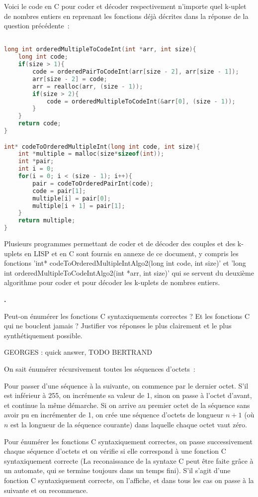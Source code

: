 \documentclass{article}
\newcounter{enoncecount}
\newenvironment{enonce}
{
\stepcounter{enoncecount}
\bf\small \arabic{enoncecount}.
\begin{bf}
}
{
\end{bf}
}
\begin{document}
Voici le code en C pour coder et décoder respectivement n'importe quel k-uplet de nombres entiers en reprenant les fonctions déjà décrites
dans la réponse de la question précédente~:

\begin{lstlisting}[language=C]

long int orderedMultipleToCodeInt(int *arr, int size){
	long int code;	
	if(size > 1){
		code = orderedPairToCodeInt(arr[size - 2], arr[size - 1]);
		arr[size - 2] = code;
		arr = realloc(arr, (size - 1));
		if(size > 2){		
			code = orderedMultipleToCodeInt(&arr[0], (size - 1));
		}
	}
	return code;
}

int* codeToOrderedMultipleInt(long int code, int size){
	int *multiple = malloc(size*sizeof(int));
	int *pair;
	int i = 0;
	for(i = 0; i < (size - 1); i++){
		pair = codeToOrderedPairInt(code);
		code = pair[1];
		multiple[i] = pair[0];
		multiple[i + 1] = pair[1];
	}
	return multiple;
}

\end{lstlisting}


Plusieurs programmes permettant de coder et de décoder des couples et des k-uplets en LISP et en C sont fournis en annexe de ce document, y
compris les fonctions 'int* codeToOrderedMultipleIntAlgo2(long int code, int size)' et 'long int orderedMultipleToCodeIntAlgo2(int *arr, int
size)' qui se servent du deuxième algorithme pour coder et pour décoder les k-uplets de nombres entiers.


\begin{enonce}
  Peut-on énumérer les fonctions C syntaxiquements correctes ? Et les fonctions C qui ne bouclent jamais ? Justifier vos réponses le plus
  clairement et le plus synthétiquement possible.
\end{enonce}

GEORGES : quick answer, TODO BERTRAND

On sait énumérer récursivement toutes les séquences d'octets~:

Pour passer d'une séquence à la suivante, on commence par le dernier octet. S'il est inférieur à 255, on incrémente sa valeur de 1, sinon on passe à l'octet d'avant, et continue la même démarche. Si on arrive au premier octet de la séquence sans avoir pu en incrémenter de 1, on crée une séquence d'octets de longueur $n + 1$ (où $n$ est la longueur de la séquence courante) dans laquelle chaque octet vaut zéro.

Pour énumérer les fonctions C syntaxiquement correctes, on passe successivement chaque séquence d'octets et on vérifie si elle correspond à une fonction C syntaxiquement correcte (La reconaissance de la syntaxe C peut être faite grâce à un automate, qui se termine toujours dans un temps fini). S'il s'agit d'une fonction C syntaxiquement correcte, on l'affiche, et dans tous les cas on passe à la suivante et on recommence.
\end{document}
